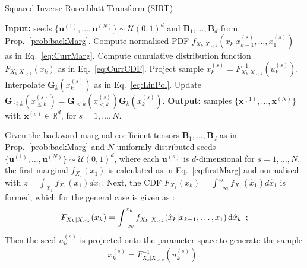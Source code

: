 \begin{algorithm}[!th]
	\caption{Squared Inverse Rosenblatt Transform (SIRT)}
	\begin{algorithmic}[1]
		\STATE \textbf{Input:} seeds $\{ \bm{u}^{(1)},\dots, \bm{u}^{(N)} \} \sim \mathcal{U}(0,1)^d $ and $\bm{B}_1 , \dots,\bm{B}_d$ from Prop.~\ref{prob:backMarg}.
		\STATE Compute normalised PDF $ f_{X_k|X_{<k}}(x_k|x^{(s)}_{k-1},\dots,x^{(s)}_1)$ as in Eq.~\ref{eq:CurrMarg}.
		\STATE Compute cumulative distribution function $F_{X_k|X_{<k}}(x_k)$ as in Eq.~\ref{eq:CurrCDF}.
		\STATE Project sample $x^{(s)}_k = F_{X_k|X_{<k}}^{-1}(u^{(s)}_k)$.
		\STATE Interpolate $\bm{G}_k(x^{(s)}_k)$ as in Eq.~\ref{eq:LinPol}.
		\STATE Update $\bm{G}_{\leq k}(x^{(s)}_{\leq k}) = \bm{G}_{<k}(x^{(s)}_{<k}) \bm{G}_k(x^{(s)}_k)$.
		\ENDFOR
		\ENDFOR
		\STATE \textbf{Output:} samples $\{ \bm{x}^{(1)},\dots, \bm{x}^{(N)} \} $ with $\bm{x}^{(s)} \in \mathbb{R}^d$, for $s = 1, \dots, N$.
	\end{algorithmic}
	\label{alg:SIRT}
\end{algorithm}
Given the backward marginal coefficient tensors $\bm{B}_1 , \dots,\bm{B}_d$ as in Prop.~\ref{prob:backMarg} and $N$ uniformly distributed seeds $\{ \bm{u}^{(1)},\dots, \bm{u}^{(N)} \} \sim \mathcal{U}(0,1)^d $, where each $\bm{u}^{(s)}$ is $d$-dimensional for $s = 1, \dots, N$, the first marginal $f_{X_1}(x_1)$ is calculated as in Eq.~\ref{eq:firstMarg} and normalised with $z = \int_{\mathcal{X}_1} f_{X_1}(x_1) d x_1$. 
Next, the CDF $F_{X_1}(x_k) = \int^{x_k}_{-\infty} f_{X_1}(\hat{x}_1) d \hat{x}_1$ is formed, which for the general case is given as \cite[Eq. 17]{cui2022deep}:
\begin{align}
	F_{X_k|X_{<k}}(x_k) = \int_{-\infty}^{x_k} f_{X_k|X_{<k}}(\hat{x}_k|x_{k-1},\dots,x_1) \mathop{}\!\mathrm{d} \hat{x}_k  \, \,  \, ;
	\label{eq:CurrCDF}
\end{align}
Then the seed $u^{(s)}_k$ is projected onto the parameter space to generate the sample 
\begin{align}
x^{(s)}_k = F_{X_k|X_{<k}}^{-1}(u^{(s)}_k) \, . \label{eq:IRTmap}
\end{align} %
